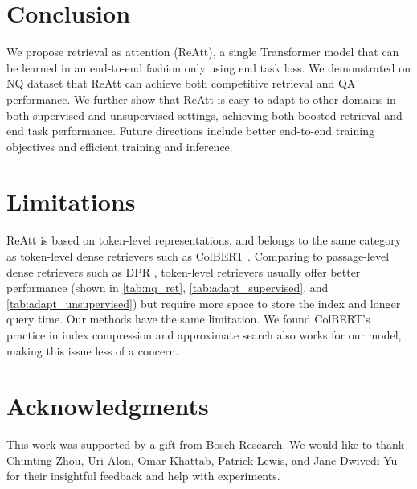 \documentclass[11pt, dvipsnames]{article}
\newcommand{\ours}{ReAtt\xspace}
\begin{document}
\section{Conclusion}
We propose retrieval as attention (\ours), a single Transformer model that can be learned in an end-to-end fashion only using end task loss.
We demonstrated on NQ dataset that \ours can achieve both competitive retrieval and QA performance.
We further show that \ours is easy to adapt to other domains in both supervised and unsupervised settings, achieving both boosted retrieval and end task performance.
Future directions include better end-to-end training objectives and efficient training and inference.

\section*{Limitations}
\ours is based on token-level representations, and belongs to the same category as token-level dense retrievers such as ColBERT \cite{colbert-2020-khattab}.
Comparing to passage-level dense retrievers such as DPR \cite{dpr-2020-karpukhin}, token-level retrievers usually offer better performance (shown in \autoref{tab:nq_ret}, \autoref{tab:adapt_supervised}, and \autoref{tab:adapt_unsupervised}) but require more space to store the index and longer query time.
Our methods have the same limitation.
We found ColBERT's practice in index compression and approximate search \cite{colbert-2020-khattab,colbertv2-2021-santhanam,plaid-2022-santhanam} also works for our model, making this issue less of a concern.

\section*{Acknowledgments}
This work was supported by a gift from Bosch Research.
We would like to thank Chunting Zhou, Uri Alon, Omar Khattab, Patrick Lewis, and Jane Dwivedi-Yu for their insightful feedback and help with experiments.



\end{document}

